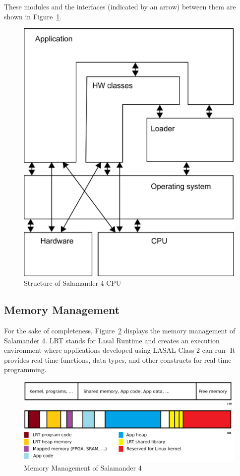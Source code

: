 \documentclass[MMR,Master,english]{twbook}
\begin{document}
\clearpage

\noindent These modules and the interfaces (indicated by an arrow) between them are shown in Figure~\ref{fig:lasal_cpu}.

\begin{figure}[H]
	\centering
	\includegraphics[width=0.5\columnwidth]{img/Software-Struktur_einer_LASAL_CPU.png}
	\caption[Structure of Salamander 4 CPU]{Structure of Salamander 4 CPU~\cite{LASALOSSIGMATEK}}
	\label{fig:lasal_cpu}
\end{figure}

\subsection{Memory Management}
\noindent For the sake of completeness, Figure~\ref{fig:memory_management} displays the memory management of Salamander 4. LRT stands for Lasal Runtime and creates an execution environment where applications developed using LASAL Class 2 can run- It provides real-time functions, data types, and other constructs for real-time programming.

\begin{figure}[H]
	\centering
	\includegraphics[width=0.8\columnwidth]{img/RAM_Memory_management.png}
	\caption[Memory Management of Salamander 4]{Memory Management of Salamander 4~\cite{LASALOSSIGMATEK}}
	\label{fig:memory_management}
\end{figure}
\end{document}
